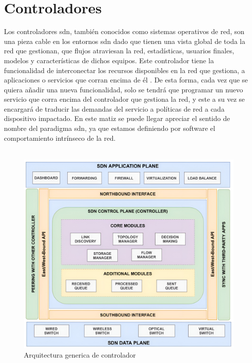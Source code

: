 \section{Controladores }
\label{sec:sdnControllers}

Los controladores \gls{sdn}, también conocidos como sistemas operativos de red, son una pieza cable en los entornos  \gls{sdn} dado que tienen una vista global de toda la red que gestionan, que flujos atraviesan la red, estadísticas, usuarios finales, modelos y características de dichos equipos. Este controlador tiene la funcionalidad de interconectar los recursos disponibles en la red que gestiona, a aplicaciones o servicios que corran encima de él \cite{nadeau2013sdn}. De esta forma, cada vez que se quiera añadir una nueva funcionalidad, solo se tendrá que programar un nuevo servicio que corra encima del controlador que gestiona la red, y este a su vez se encargará de traducir las demandas del servicio a políticas de red a cada dispositivo impactado. En este matiz se puede llegar apreciar el sentido de nombre del paradigma \gls{sdn}, ya que estamos definiendo por software el comportamiento intrínseco de la red.\\
\\
\begin{figure}[ht]
    \centering
    \includegraphics[width=\textwidth]{archivos/img/teoria/sdn_controllers.jpg}
    \caption{Arquitectura generica de controlador  \cite{zhu2020sdn}}
    \label{fig:sdn_controllers}
\end{figure}

